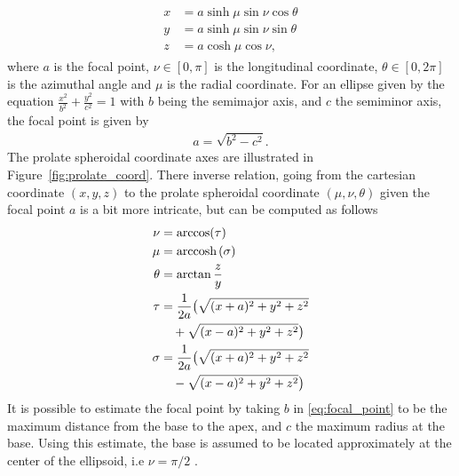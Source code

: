 \begin{align}
  \begin{split}
    x &= a \sinh \mu \sin \nu \cos \theta  \\
    y &= a \sinh \mu \sin \nu \sin \theta  \\
    z &= a \cosh \mu \cos \nu,
  \end{split}
\end{align}
where $a$ is the focal point, $\nu \in [0, \pi]$ is the longitudinal
coordinate, $\theta \in [0, 2\pi]$ is the azimuthal angle and $\mu$
is the radial coordinate. For an ellipse given by the equation
$\frac{x^2}{b^2} +\frac{y^2}{c^2}  = 1$ with $b$ being the semimajor
axis, and $c$ the semiminor axis, the focal point is given by
\begin{align}
  a =\sqrt{b^2 - c^2}.
  \label{eq:focal_point}
\end{align}
The prolate spheroidal coordinate axes are illustrated in
Figure~\ref{fig:prolate_coord}. There inverse relation, going from the
cartesian coordinate $(x,y,z)$ to the prolate spheroidal coordinate
$(\mu, \nu, \theta)$ given the focal point $a$ is a bit more
intricate, but can be computed as follows 
\begin{align}
  \begin{split}
    \nu &= \arccos (\tau) \\
    \mu &= \mathrm{arccosh} \hspace{0.05cm} (\sigma) \\
    \theta &= \arctan \frac{z}{y} \\
    \tau &= \frac{1}{2a} \big( \sqrt{(x + a)^2 + y^2 + z^2} \\
    & \quad + \sqrt{(x - a)^2 + y^2 + z^2} \big) \\
    \sigma &= \frac{1}{2a} \big( \sqrt{(x + a)^2 + y^2 + z^2}\\
    & \quad - \sqrt{(x - a)^2 + y^2 + z^2}\big) 
  \end{split}
\end{align}
It is possible to estimate the focal point by taking $b$ in
\eqref{eq:focal_point} to be the maximum distance from the base to the
apex, and $c$ the maximum radius at the base. Using this estimate,
the base is assumed to be located approximately at the center of the
ellipsoid, i.e $\nu = \pi / 2$ \cite{land2015verification}.
